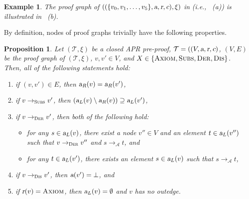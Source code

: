 \documentclass[10pt,a4paper]{article}
\newtheorem{proposition}[theorem]{Proposition}
\newtheorem{example}[theorem]{Example}
\def\cA{\mathcal{A}}
\def\cT{\mathcal{T}}
\newcommand{\RuleName}[1]{{\rm \textsc{#1}}}
\newcommand{\varsl}[1]{\mbox{\sl #1}}
\newcommand{\Path}[1]{\to_{\mbox{\scriptsize \RuleName{#1}}}}
\newcommand{\toDer}{\Path{Der}}
\newcommand{\toSubs}{\Path{Subs}}
\newcommand{\toDis}{\Path{Dis}}
\begin{document}
\begin{example}
	The proof graph of $((\{v_0,v_1,\ldots,v_5\},\varsl{a},\varsl{r},\varsl{c}),\xi)$ in  (i.e., ~(a)) is illustrated in ~(b).
\end{example}

By definition, nodes of proof graphs trivially have the following properties.
\begin{proposition}
	\label{prop:basic-properties-of-proof-graphs}
	Let $(\cT,\xi)$ be a closed APR pre-proof,
	$\cT= ((V,\varsl{a},\varsl{r},\varsl{c})$,
	$(V,E)$ be the proof graph of $(\cT,\xi)$,
	$v,v' \in V$,
	and
	$X \in  \{ \mbox{\rm\RuleName{Axiom}}, \mbox{\rm\RuleName{Subs}}, \mbox{\rm\RuleName{Der}}, \mbox{\rm\RuleName{Dis}} \}$.
	Then, all of the following statements hold:
	\begin{enumerate}
		\renewcommand{\labelenumi}{(\arabic{enumi})}
		\leftskip=1ex
		\item if $(v,v') \in E$, then $\varsl{a}_R(v) = \varsl{a}_R(v')$,
		\item if $v \toSubs v'$, then $(\varsl{a}_L(v) \setminus \varsl{a}_R(v)) \supseteq \varsl{a}_L(v')$,
		\item if $v \toDer v'$, then both of the following hold:
		      \begin{itemize}
			      \item for any $s \in \varsl{a}_L(v)$, there exist a node $v'' \in V$ and an element $t \in \varsl{a}_L(v'')$ such that
			            $v \toDer v''$ and $s \to_\cA t$,
			            and
			      \item for any $t \in \varsl{a}_L(v')$, there exists an element $s \in \varsl{a}_L(v)$ such that $s \to_\cA t$,
		      \end{itemize}
		\item if $v \toDis v'$, then $\varsl{a}(v') = \bot$,
		      and
		\item if $\varsl{r}(v) = \mbox{\rm\RuleName{Axiom}}$, then
		      $\varsl{a}_L(v) = \emptyset$ and $v$ has no outedge.
	\end{enumerate}
\end{proposition}
\end{document}
